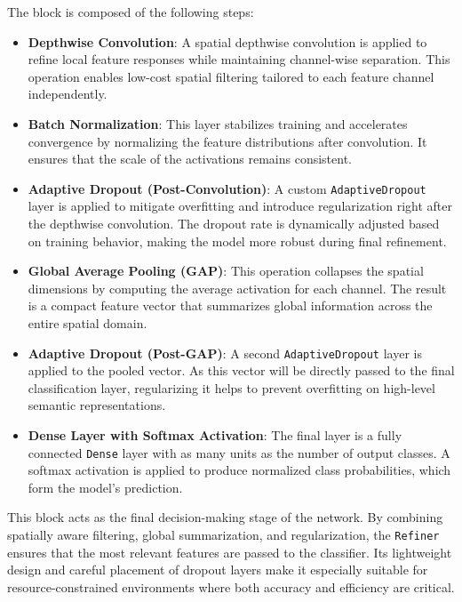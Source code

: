 The block is composed of the following steps:

\begin{itemize}
    \item \textbf{Depthwise Convolution}: A spatial depthwise convolution is applied to refine local feature responses while maintaining channel-wise separation. This operation enables low-cost spatial filtering tailored to each feature channel independently.
    
    \item \textbf{Batch Normalization}: This layer stabilizes training and accelerates convergence by normalizing the feature distributions after convolution. It ensures that the scale of the activations remains consistent.
    
    \item \textbf{Adaptive Dropout (Post-Convolution)}: A custom \texttt{AdaptiveDropout} layer is applied to mitigate overfitting and introduce regularization right after the depthwise convolution. The dropout rate is dynamically adjusted based on training behavior, making the model more robust during final refinement.
    
    \item \textbf{Global Average Pooling (GAP)}: This operation collapses the spatial dimensions by computing the average activation for each channel. The result is a compact feature vector that summarizes global information across the entire spatial domain.
    
    \item \textbf{Adaptive Dropout (Post-GAP)}: A second \texttt{AdaptiveDropout} layer is applied to the pooled vector. As this vector will be directly passed to the final classification layer, regularizing it helps to prevent overfitting on high-level semantic representations.
    
    \item \textbf{Dense Layer with Softmax Activation}: The final layer is a fully connected \texttt{Dense} layer with as many units as the number of output classes. A softmax activation is applied to produce normalized class probabilities, which form the model's prediction.
    
\end{itemize}

This block acts as the final decision-making stage of the network. By combining spatially aware filtering, global summarization, and regularization, the \texttt{Refiner} ensures that the most relevant features are passed to the classifier. Its lightweight design and careful placement of dropout layers make it especially suitable for resource-constrained environments where both accuracy and efficiency are critical.



